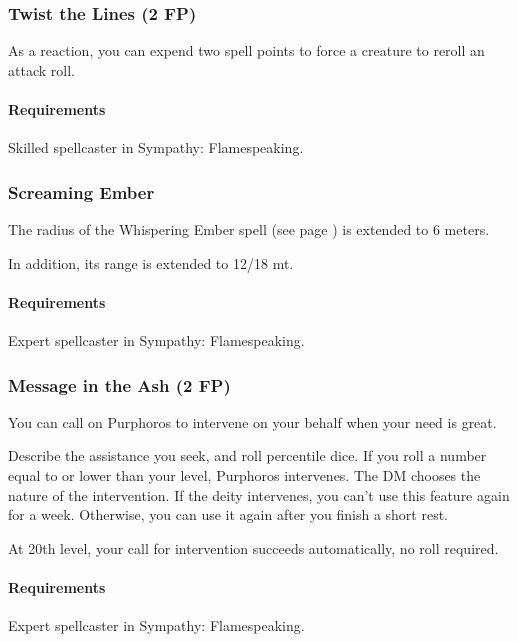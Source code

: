 \subsubsection{Twist the Lines (2 FP)} \label{feat::twistthelines}
    As a reaction, you can expend two spell points to force a creature to reroll an attack roll.
    \paragraph{Requirements} Skilled spellcaster in Sympathy: Flamespeaking.
\subsubsection{Screaming Ember} \label{feat::screamingember}
    The radius of the Whispering Ember spell (see page \pageref{spell::whisperingember}) is extended to 6 meters.

    In addition, its range is extended to 12/18 mt.
    \paragraph{Requirements} Expert spellcaster in Sympathy: Flamespeaking.
\subsubsection{Message in the Ash (2 FP)} \label{feat::messageintheash}
    You can call on Purphoros to intervene on your behalf when your need is great.

    Describe the assistance you seek, and roll percentile dice.
    If you roll a number equal to or lower than your level, Purphoros intervenes.
    The DM chooses the nature of the intervention.
    If the deity intervenes, you can't use this feature again for a week.
    Otherwise, you can use it again after you finish a short rest.

    At 20th level, your call for intervention succeeds automatically, no roll required.
    \paragraph{Requirements} Expert spellcaster in Sympathy: Flamespeaking.

\newpage~
\newpage
